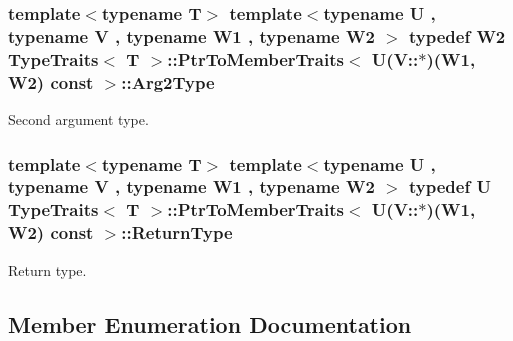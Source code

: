 \subsubsection[{\texorpdfstring{Arg2\+Type}{Arg2Type}}]{\setlength{\rightskip}{0pt plus 5cm}template$<$typename T$>$ template$<$typename U , typename V , typename W1 , typename W2 $>$ typedef W2 {\bf Type\+Traits}$<$ T $>$\+::{\bf Ptr\+To\+Member\+Traits}$<$ U(V\+::$\ast$)(W1, W2) const  $>$\+::{\bf Arg2\+Type}}\hypertarget{structTypeTraits_1_1PtrToMemberTraits_3_01U_07V_1_1_5_08_07W1_00_01W2_08_01const_01_01_4_aaa85a115596e04ee27fdd88db17724a2}{}\label{structTypeTraits_1_1PtrToMemberTraits_3_01U_07V_1_1_5_08_07W1_00_01W2_08_01const_01_01_4_aaa85a115596e04ee27fdd88db17724a2}
Second argument type. 
\subsubsection[{\texorpdfstring{Return\+Type}{ReturnType}}]{\setlength{\rightskip}{0pt plus 5cm}template$<$typename T$>$ template$<$typename U , typename V , typename W1 , typename W2 $>$ typedef U {\bf Type\+Traits}$<$ T $>$\+::{\bf Ptr\+To\+Member\+Traits}$<$ U(V\+::$\ast$)(W1, W2) const  $>$\+::{\bf Return\+Type}}\hypertarget{structTypeTraits_1_1PtrToMemberTraits_3_01U_07V_1_1_5_08_07W1_00_01W2_08_01const_01_01_4_a5ad1c5f1ba1aede7b1234b6b0bc902af}{}\label{structTypeTraits_1_1PtrToMemberTraits_3_01U_07V_1_1_5_08_07W1_00_01W2_08_01const_01_01_4_a5ad1c5f1ba1aede7b1234b6b0bc902af}
Return type. 

\subsection{Member Enumeration Documentation}
